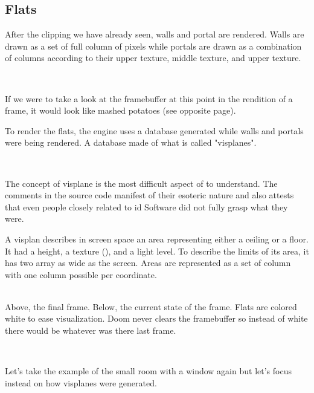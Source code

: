 \subsection{Flats}
After the clipping we have already seen, walls and portal are rendered. Walls are drawn as a set of full column of pixels while portals are drawn as a combination of columns according to their upper texture, middle texture, and upper texture.\\
\par
{}\\
\par
 If we were to take a look at the framebuffer at this point in the rendition of a frame, it would look like mashed potatoes (see opposite page).\\
\par
To render the flats, the engine uses a database generated while walls and portals were being rendered. A database made of what is called "visplanes".\\
\par
{}\\
\par
The concept of visplane is the most difficult aspect of \doom to understand. The comments in the source code manifest of their esoteric nature and also attests that even people closely related to id Software did not fully grasp what they were.\\
\par
A visplan describes in screen space an area representing either a ceiling or a floor. It had a height, a texture (), and a light level. To describe the limits of its area, it has two array as wide as the screen. Areas are represented as a set of column with one column possible per  coordinate.\\
\par


\\
Above, the final frame. Below, the current state of the frame. Flats are colored white to ease visualization. Doom never clears the framebuffer so instead of white there would be whatever was there last frame.\\
\par


\\
\par
Let's take the example of the small room with a window again but let's focus instead on how visplanes were generated.\\
\par
{}

